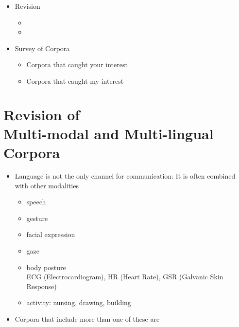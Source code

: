 \documentclass[a4paper,landscape,headrule,footrule,xetex]{foils}
\begin{document}

\maketitle



\begin{itemize} 
\item Revision 
  \begin{itemize}
  \item {}
  \item {}
  \end{itemize}
\item Survey of Corpora
  \begin{itemize}
  \item Corpora that caught your interest
  \item Corpora that caught my interest
  \end{itemize}
\end{itemize}



\section{Revision of \\
Multi-modal  and Multi-lingual Corpora}



\begin{itemize}
\item Language is not the only channel for communication: It is often
  combined with other modalities
  \begin{itemize}
  \item speech
  \item gesture
  \item facial expression
  \item gaze
  \item body posture
\\ ECG (Electrocardiogram), HR (Heart Rate), GSR (Galvanic Skin Response)
  \item activity: nursing, drawing, building
  \end{itemize}
\item Corpora that include more than one of these are 
\end{itemize}
\end{document}
